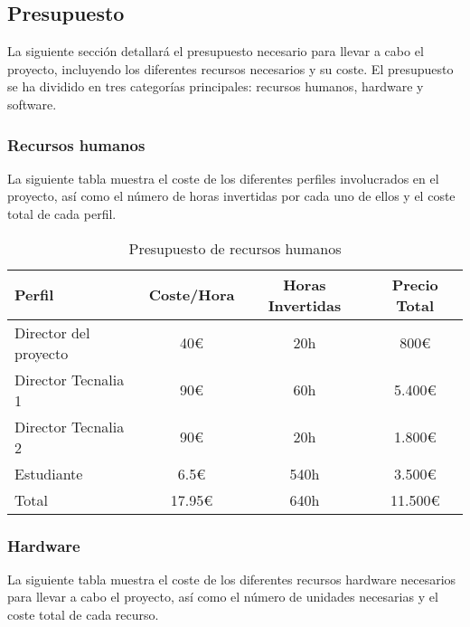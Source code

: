 \subsection{Presupuesto}
La siguiente sección detallará el presupuesto necesario para llevar a cabo el
proyecto, incluyendo los diferentes recursos necesarios y su coste. El
presupuesto se ha dividido en tres categorías principales: recursos humanos,
hardware y software.

\subsubsection{Recursos humanos}
La siguiente tabla muestra el coste de los diferentes perfiles involucrados en
el proyecto, así como el número de horas invertidas por cada uno de ellos y el
coste total de cada perfil.

\begin{table}[ht]
    \centering
    \begin{tabular}[ht]{l|c|c|c}
        \textbf{Perfil}       & \textbf{Coste/Hora} & \textbf{Horas Invertidas} & \textbf{Precio Total} \\
        \hline
        Director del proyecto & 40\euro             & 20h                       & 800\euro              \\
        Director Tecnalia 1   & 90\euro             & 60h                       & 5.400\euro            \\
        Director Tecnalia 2   & 90\euro             & 20h                       & 1.800\euro            \\
        Estudiante            & 6.5\euro            & 540h                      & 3.500\euro            \\
        \hline
        Total                 & 17.95\euro           & 640h                      & 11.500\euro           \\
    \end{tabular}
    \caption{Presupuesto de recursos humanos}\label{tab:huma-resources}
\end{table}

\subsubsection{Hardware}
La siguiente tabla muestra el coste de los diferentes recursos hardware
necesarios para llevar a cabo el proyecto, así como el número de unidades
necesarias y el coste total de cada recurso.

